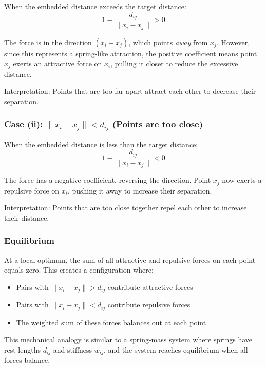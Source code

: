 \documentclass[a4paper]{scrartcl}
\begin{document}
When the embedded distance exceeds the target distance:
\[
1 - \frac{d_{ij}}{\|x_i - x_j\|} > 0
\]

The force is in the direction $(x_i - x_j)$, which points \textit{away} from $x_j$. However, since this represents a spring-like attraction, the positive coefficient means point $x_j$ exerts an attractive force on $x_i$, pulling it closer to reduce the excessive distance.

Interpretation: Points that are too far apart attract each other to decrease their separation.

\subsubsection*{Case (ii): $\|x_i - x_j\| < d_{ij}$ (Points are too close)}

When the embedded distance is less than the target distance:
\[
1 - \frac{d_{ij}}{\|x_i - x_j\|} < 0
\]

The force has a negative coefficient, reversing the direction. Point $x_j$ now exerts a repulsive force on $x_i$, pushing it away to increase their separation.

Interpretation: Points that are too close together repel each other to increase their distance.

\subsubsection*{Equilibrium}

At a local optimum, the sum of all attractive and repulsive forces on each point equals zero. This creates a configuration where:
\begin{itemize}
    \item Pairs with $\|x_i - x_j\| > d_{ij}$ contribute attractive forces
    \item Pairs with $\|x_i - x_j\| < d_{ij}$ contribute repulsive forces
    \item The weighted sum of these forces balances out at each point
\end{itemize}

This mechanical analogy is similar to a spring-mass system where springs have rest lengths $d_{ij}$ and stiffness $w_{ij}$, and the system reaches equilibrium when all forces balance.
\end{document}
